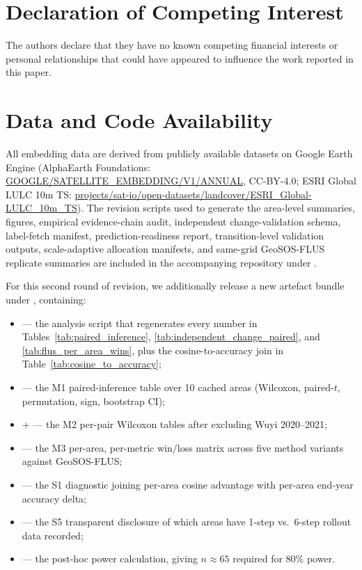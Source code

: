 \documentclass{article}
\begin{document}
\section*{Declaration of Competing Interest}
The authors declare that they have no known competing financial interests or personal relationships that could have appeared to influence the work reported in this paper.

\section*{Data and Code Availability}
All embedding data are derived from publicly available datasets on Google Earth Engine (AlphaEarth Foundations: \url{GOOGLE/SATELLITE_EMBEDDING/V1/ANNUAL}, CC-BY-4.0; ESRI Global LULC 10m TS: \url{projects/sat-io/open-datasets/landcover/ESRI_Global-LULC_10m_TS}). The revision scripts used to generate the area-level summaries, figures, empirical evidence-chain audit, independent change-validation schema, label-fetch manifest, prediction-readiness report, transition-level validation outputs, scale-adaptive allocation manifests, and same-grid GeoSOS-FLUS replicate summaries are included in the accompanying repository under .

For this second round of revision, we additionally release a new artefact bundle under , containing:
\begin{itemize}
\item {} --- the analysis script that regenerates every number in Tables~\ref{tab:paired_inference}, \ref{tab:independent_change_paired}, and \ref{tab:flus_per_area_wins}, plus the cosine-to-accuracy join in Table~\ref{tab:cosine_to_accuracy};
\item {} --- the M1 paired-inference table over 10 cached areas (Wilcoxon, paired-$t$, permutation, sign, bootstrap CI);
\item {} +  --- the M2 per-pair Wilcoxon tables after excluding Wuyi 2020--2021;
\item {} --- the M3 per-area, per-metric win/loss matrix across five method variants against GeoSOS-FLUS;
\item {} --- the S1 diagnostic joining per-area cosine advantage with per-area end-year accuracy delta;
\item {} --- the S5 transparent disclosure of which areas have 1-step vs.\ 6-step rollout data recorded;
\item {} --- the post-hoc power calculation, giving $n \approx 65$ required for 80\% power.
\end{itemize}
\end{document}
